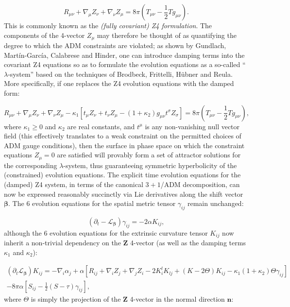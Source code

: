 \documentclass{article}
\begin{document}
\begin{equation}
R_{\mu \nu} + \nabla_{\mu} Z_{\nu} + \nabla_{\nu} Z_{\mu} = 8 \pi \left( T_{\mu \nu} - \frac{1}{2} T g_{\mu \nu} \right).
\end{equation}
This is commonly known as the \textit{(fully covariant) Z4 formulation}. The components of the 4-vector ${Z_{\mu}}$ may therefore be thought of as quantifying the degree to which the ADM constraints are violated; as shown by Gundlach, Mart\'in-Garc\'ia, Calabrese and Hinder\cite{gundlach}, one can introduce damping terms into the covariant Z4 equations so as to formulate the evolution equations as a so-called ``${\lambda}$-system'' based on the techniques of Brodbeck, Frittelli, H\"ubner and Reula\cite{brodbeck}. More specifically, if one replaces the Z4 evolution equations with the damped form:

\begin{equation}
R_{\mu \nu} + \nabla_{\mu} Z_{\nu} + \nabla_{\nu} Z_{\mu} - \kappa_1 \left[ t_{\mu} Z_{\nu} + t_{\nu} Z_{\mu} - \left( 1 + \kappa_2 \right) g_{\mu \nu} t^{\sigma} Z_{\sigma} \right] = 8 \pi \left( T_{\mu \nu} - \frac{1}{2} T g_{\mu \nu} \right),
\end{equation}
where ${\kappa_1 \geq 0}$ and ${\kappa_2}$ are real constants, and ${t^{\mu}}$ is any non-vanishing null vector field (this effectively translates to a weak constraint on the permitted choices of ADM gauge conditions), then the surface in phase space on which the constraint equations ${Z_{\mu} = 0}$ are satisfied will provably form a set of attractor solutions for the corresponding ${\lambda}$-system, thus guaranteeing symmetric hyperbolicity of the (constrained) evolution equations. The explicit time evolution equations for the (damped) Z4 system, in terms of the canonical ${3 + 1}$/ADM decomposition, can now be expressed reasonably succinctly via Lie derivatives along the shift vector ${\boldsymbol\beta}$. The 6 evolution equations for the spatial metric tensor ${\gamma_{i j}}$ remain unchanged:

\begin{equation}
\left( \partial_t - \mathcal{L}_{\boldsymbol\beta} \right) \gamma_{i j} = - 2 \alpha K_{i j},
\end{equation}
although the 6 evolution equations for the extrinsic curvature tensor ${K_{i j}}$ now inherit a non-trivial dependency on the ${\mathbf{Z}}$ 4-vector (as well as the damping terms ${\kappa_1}$ and ${\kappa_2}$):

\begin{multline}
\left( \partial_t \mathcal{L}_{\boldsymbol\beta} \right) K_{i j} = - \nabla_i \alpha_j + \alpha \left[ R_{i j} + \nabla_i Z_j + \nabla_j Z_i - 2 K_{i}^{l} K_{l j} + \left( K - 2 \Theta \right) K_{i j} - \kappa_1 \left( 1 + \kappa_2 \right) \Theta \gamma_{i j} \right]\\
- 8 \pi \alpha \left[ S_{i j} - \frac{1}{2} \left( S - \tau \right) \gamma_{i j} \right],
\end{multline}
where ${\Theta}$ is simply the projection of the ${\mathbf{Z}}$ 4-vector in the normal direction ${\mathbf{n}}$:
\end{document}
